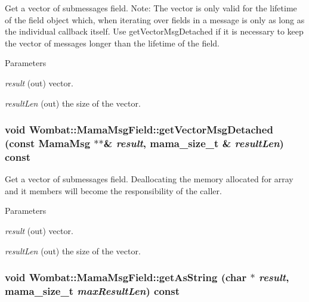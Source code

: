 Get a vector of submessages field. Note: The vector is only valid for the lifetime of the field object which, when iterating over fields in a message is only as long as the individual callback itself. Use getVectorMsgDetached if it is necessary to keep the vector of messages longer than the lifetime of the field. 
\begin{DoxyParams}{Parameters}
\item[{\em result}](out) vector. \item[{\em resultLen}](out) the size of the vector. \end{DoxyParams}
\hypertarget{classWombat_1_1MamaMsgField_a8836dd179daf0d79f967eaafe4e7628e}{
\subsubsection[{getVectorMsgDetached}]{\setlength{\rightskip}{0pt plus 5cm}void Wombat::MamaMsgField::getVectorMsgDetached (const {\bf MamaMsg} $\ast$$\ast$\& {\em result}, \/  {\bf mama\_\-size\_\-t} \& {\em resultLen}) const}}
\label{classWombat_1_1MamaMsgField_a8836dd179daf0d79f967eaafe4e7628e}


Get a vector of submessages field. Deallocating the memory allocated for array and it members will become the responsibility of the caller. 
\begin{DoxyParams}{Parameters}
\item[{\em result}](out) vector. \item[{\em resultLen}](out) the size of the vector. \end{DoxyParams}
\hypertarget{classWombat_1_1MamaMsgField_ad3f262839c73e178cbbe705a5e3bddc7}{
\subsubsection[{getAsString}]{\setlength{\rightskip}{0pt plus 5cm}void Wombat::MamaMsgField::getAsString (char $\ast$ {\em result}, \/  {\bf mama\_\-size\_\-t} {\em maxResultLen}) const}}
\label{classWombat_1_1MamaMsgField_ad3f262839c73e178cbbe705a5e3bddc7}


